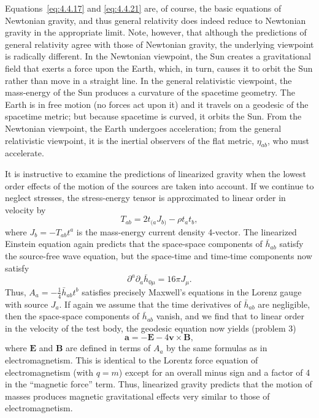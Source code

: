 Equations~\eqref{eq:4.4.17} and \eqref{eq:4.4.21} are, of course, the basic
equations of Newtonian gravity, and thus general relativity does indeed reduce to
Newtonian gravity in the appropriate limit. Note, however, that although the
predictions of general relativity agree with those of Newtonian gravity, the
underlying viewpoint is radically different. In the Newtonian viewpoint, the Sun
creates a gravitational field that exerts a force upon the Earth, which, in turn,
causes it to orbit the Sun rather than move in a straight line. In the general
relativistic viewpoint, the mass-energy of the Sun produces a curvature of the
spacetime geometry. The Earth is in free motion (no forces act upon it) and it
travels on a geodesic of the spacetime metric; but because spacetime is curved, it
orbits the Sun. From the Newtonian viewpoint, the Earth undergoes acceleration;
from the general relativistic viewpoint, it is the inertial observers of the flat metric,
\(\eta_{ab}\), who must accelerate.

It is instructive to examine the predictions of linearized gravity when the lowest
order effects of the motion of the sources are taken into account. If we continue to
neglect stresses, the stress-energy tensor is approximated to linear order in velocity
by
\begin{equation}
  T_{ab}=2t_{(a}J_{b)}-\rho t_at_b ,
  \tag{4.4.22}\label{eq:4.4.22}
\end{equation}
where \(J_b=-T_{ab}t^a\) is the mass-energy current density 4-vector. The
linearized Einstein equation again predicts that the space-space components of
\(\bar h_{ab}\) satisfy the source-free wave equation, but the space-time and
time-time components now satisfy
\begin{equation}
  \partial^a\partial_a\bar h_{0\mu}=16\pi J_\mu .
  \tag{4.4.23}\label{eq:4.4.23}
\end{equation}
Thus, \(A_a=-\tfrac14\bar h_{ab}t^b\) satisfies precisely Maxwell's equations in
the Lorenz gauge with source \(J_a\). If again we assume that the time derivatives
of \(\bar h_{ab}\) are negligible, then the space-space components of
\(\bar h_{ab}\) vanish, and we find that to linear order in the velocity of the test
body, the geodesic equation now yields (problem 3)
\begin{equation}
  \mathbf{a}=-\mathbf{E}-4\mathbf{v}\mathbin{\times}\mathbf{B} ,
  \tag{4.4.24}\label{eq:4.4.24}
\end{equation}
where \(\mathbf{E}\) and \(\mathbf{B}\) are defined in terms of \(A_a\) by the same
formulas as in electromagnetism. This is identical to the Lorentz force equation of
electromagnetism (with \(q=m\)) except for an overall minus sign and a factor of 4
in the ``magnetic force'' term. Thus, linearized gravity predicts that the motion of
masses produces magnetic gravitational effects very similar to those of
electromagnetism.

